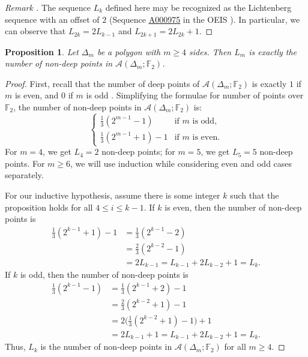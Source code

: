 \documentclass[reqno,12pt]{amsart}
\newtheorem{prop}[thm]{Proposition}
\theoremstyle{definition}
\theoremstyle{remark}
\theoremstyle{remark}
\newenvironment{rem}{\refstepcounter{thm}\begin{proof}[Remark \emph{\thethm}]\renewcommand*{\qedsymbol}{\(\blacksquare\)}}{\end{proof}}
\numberwithin{equation}{section}
\newcommand{\seqnum}[1]{\href{https://oeis.org/#1}{\rm \underline{#1}}}
\begin{document}
\begin{rem}\label{rem: Lichtenberg}
	The sequence $L_k$ defined here may be recognized as the Lichtenberg sequence with an offset of $2$ (Sequence \seqnum{A000975} in the OEIS \cite{oeis}). In particular, we can observe that $L_{2k} = 2L_{k-1}$ and $L_{2k+1} = 2L_{2k}+1$.
\end{rem}

\begin{prop}\label{prop: polygon non-deep}
	Let $\Delta_m$ be a polygon with $m\geq 4$ sides. Then $L_m$ is exactly the number of non-deep points in $\mathcal{A}(\Delta_m; \mathbb{F}_2)$.
\end{prop}
\begin{proof}
	First, recall that the number of deep points of $\mathcal{A}(\Delta_m; \mathbb{F}_2)$ is exactly $1$ if $m$ is even, and $0$ if $m$ is odd \cite[Theorem 3.5]{BM25}. Simplifying the formulae for number of points over $\mathbb{F}_2$, the number of non-deep points in $\mathcal{A}(\Delta_m; \mathbb{F}_2)$ is:
	\[ \begin{cases}
	 	\frac{1}{3} (2^{m-1}-1) &\text{if $m$ is odd,} \\
		\frac{1}{3} (2^{m-1}+1)-1 &\text{if $m$ is even.}
	\end{cases} \]	
	For $m=4$, we get $L_4 = 2$ non-deep points; for $m=5$, we get $L_5 = 5$ non-deep points. For $m\geq 6$, we will use induction while considering even and odd cases separately. 
	
	For our inductive hypothesis, assume there is some integer $k$ such that the proposition holds for all $4\leq i \leq k-1$. If $k$ is even, then the number of non-deep points is 
\begin{align*}
	\frac{1}{3} (2^{k-1}+1) - 1 &= \frac{1}{3}(2^{k-1} - 2) \\ &= \frac{2}{3}(2^{k-2} - 1) \\ &= 2L_{k-1} = L_{k-1} + 2 L_{k-2} + 1 = L_k.
\end{align*}
	If $k$ is odd, then the number of non-deep points is 
\begin{align*}
	\frac{1}{3} (2^{k-1}-1) &= \frac{1}{3}(2^{k-1} + 2) - 1 \\ &= \frac{2}{3}(2^{k-2} + 1) - 1 \\ &= 2\bigg(\frac{1}{3}(2^{k-2} + 1) - 1\bigg) + 1 \\ &= 2L_{k-1} + 1 = L_{k-1} + 2 L_{k-2} + 1 = L_k.
\end{align*}
Thus, $L_k$ is the number of non-deep points in $\mathcal{A}(\Delta_m; \mathbb{F}_2)$ for all $m\geq 4$. 
\end{proof}
\end{document}
